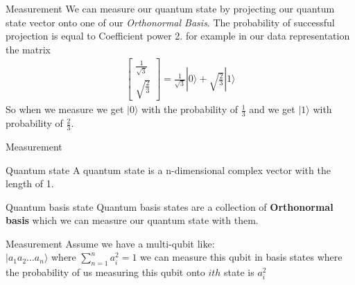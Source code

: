     \begin{frame}{Measurement}
        We can measure our quantum state by projecting our quantum state vector onto 
        one of our \emph{Orthonormal Basis}. The probability of successful projection is equal to Coefficient power 2.
        for example in our data representation the matrix\\
        \begin{align*}
        \begin{bmatrix}
            \frac{1}{\sqrt{3}}\\
            \sqrt{\frac{2}{3}}
        \end{bmatrix}
        = \frac{1}{\sqrt{3}} |0\rangle + \sqrt{\frac{2}{3}} |1\rangle
    \end{align*}
    So when we measure we get $|0\rangle$ with the probability of 
    $\frac{1}{3}$ and we get $|1\rangle$ with probability of $\frac{2}{3}$.
    \end{frame}
    \begin{frame}{Measurement}
        \begin{block}{Quantum state}
            A quantum state is a n-dimensional complex vector with the length of 1. 
        \end{block}
        \pause
        \begin{block}{Quantum basis state}
            Quantum basis states are a collection of \textbf{Orthonormal basis}
            which we can measure our quantum state with them.
        \end{block}
        \pause
        \begin{block}{Measurement}
            Assume we have a multi-qubit like:\\
            $|a_1a_2 \dots a_n \rangle$ where 
            $\sum_{n = 1}^{n} a_i^2 = 1$
            we can measure this qubit in basis states where the probability
            of us measuring this qubit onto $ith$ state is $a_i^2$
        \end{block}
    \end{frame}
